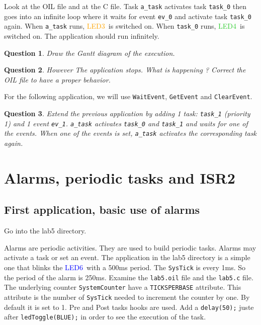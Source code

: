 \documentclass[11pt]{article}
\newtheorem{ex}{Question}
\newcommand{\LEDorange}{\textcolor{orange}{LED3}}
\newcommand{\LEDgreen}{\textcolor{LimeGreen}{LED4}}
\newcommand{\LEDblue}{\textcolor{blue}{LED6}}
\begin{document}
Look at the OIL file and at the C file. Task \lstinline{a_task} activates task \lstinline{task_0} then goes into an infinite loop where it waits for event \lstinline{ev_0} and activate task \lstinline{task_0} again. When \lstinline{a_task} runs, \LEDorange\ is switched on. When \lstinline{task_0} runs, \LEDgreen\ is switched on. The application should run infinitely. 

\begin{ex}
Draw the Gantt diagram of the execution.
\end{ex}

\begin{ex}
However The application stops. What is happening ? Correct the OIL file to have a proper behavior.
\end{ex}

For the following application, we will use \lstinline{WaitEvent}, \lstinline{GetEvent} and \lstinline{ClearEvent}.
\begin{ex}
Extend the previous application by adding 1 task: \texttt{task_1} (priority 1) and 1 event \texttt{ev_1}. \texttt{a_task} activates \texttt{task_0} and \texttt{task_1} and waits for one of the events. When one of the events is set, \texttt{a_task} activates the corresponding task again.
\end{ex}

\section{Alarms, periodic tasks and ISR2}

\subsection{First application, basic use of alarms}

Go into the lab5 directory.

Alarms are periodic activities. They are used to build periodic tasks. Alarms may activate a task or set an event. The application in the lab5 directory is a simple one that blinks the \LEDblue\ with a 500ms period. The \lstinline{SysTick} is every 1ms. So the period of the alarm is 250ms. Examine the \lstinline{lab5.oil} file and the \lstinline{lab5.c} file. The underlying counter \lstinline{SystemCounter} have a \lstinline{TICKSPERBASE} attribute. This attribute is the number of \lstinline{SysTick} needed to increment the counter by one. By default it is set to 1. Pre and Post tasks hooks are used. Add a \lstinline{delay(50);} juste after \lstinline{ledToggle(BLUE);} in order to see the execution of the task.
\end{document}
